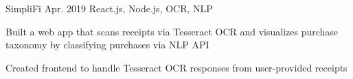 \begin{cvprojects}




  \cvproject
  {SimpliFi}
  {\href{https://github.com/unitehenry/simply-finance}{\faGithubSquare\acvHeaderIconSep{}}}
  {Apr. 2019}
  {React.js, Node.js, OCR, NLP}
  {
    \begin{cvitems}
      \item {Built a web app that scans receipts via Tesseract OCR and visualizes purchase taxonomy by classifying purchases via NLP API}
      \item {Created frontend to handle Tesseract OCR responses from user-provided receipts}
    \end{cvitems}
  }


\end{cvprojects}
